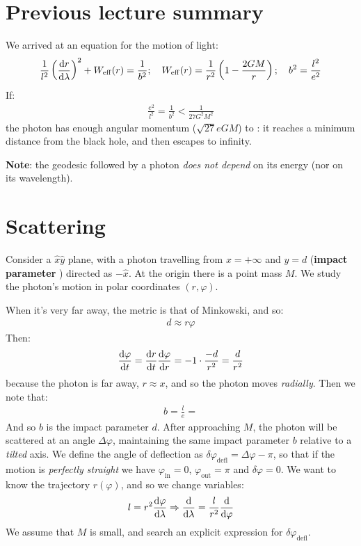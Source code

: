 \documentclass[../template.tex]{subfiles}
\begin{document}
\section{Previous lecture summary}
We arrived at an equation for the motion of light:
\begin{align*}
    \frac{1}{l^2}\left(\dv{r}{\lambda}\right)^2 + W_{\mathrm{eff} }(r) = \frac{1}{b^2}; \quad W_{\mathrm{eff} }(r) = \frac{1}{r^2} \left(1-\frac{2GM}{r} \right); \quad b^2 = \frac{l^2}{e^2}    
\end{align*}
If:
\begin{align*}
    \frac{e^2}{l^2} = \frac{1}{b^2} < \frac{1}{27 G^2M^2}   
\end{align*} 
the photon has enough angular momentum ($\sqrt{27} e GM$) to : it reaches a minimum distance from the black hole, and then escapes to infinity.

\begin{expl}
    \textbf{Note}: the geodesic followed by a photon \textit{does not depend} on its energy (nor on its wavelength).  
\end{expl}

\section{Scattering}
Consider a $\hat{x}\hat{y}$ plane, with a photon travelling from $x=+\infty$ and $y=d$ (\textbf{impact parameter} ) directed as $-\hat{x}$. At the origin there is a point mass $M$. We study the photon's motion in polar coordinates $(r, \varphi)$. 

When it's very far away, the metric is that of Minkowski, and so:
\begin{align*}
    d \approx r \varphi
\end{align*} 
Then:
\begin{align*}
    \dv{\varphi}{t} = \dv{r}{t} \dv{\varphi}{r} = -1 \cdot \frac{-d}{r^2} = \frac{d}{r^2}  
\end{align*}
because the photon is far away, $r \approx x$, and so the photon moves \textit{radially}. Then we note that:
\begin{align*}
    b = \frac{l}{e} =   
\end{align*}
And so $b$ is the impact parameter $d$. After approaching $M$, the photon will be scattered at an angle $\Delta \varphi$, maintaining the same impact parameter $b$ relative to a \textit{tilted} axis. We define the angle of deflection as $\delta\varphi_{\mathrm{defl} } = \Delta \varphi - \pi$, so that if the motion is \textit{perfectly straight} we have $\varphi_{\mathrm{in} } = 0$, $\varphi_\mathrm{out} = \pi$ and $\delta\varphi = 0$. We want to know the trajectory $r(\varphi)$, and so we change variables:
\begin{align*}
    l = r^2 \dv{\varphi}{\lambda} \Rightarrow \dv{\lambda} = \frac{l}{r^2} \dv{\varphi} 
\end{align*}        
We assume that $M$ is small, and search an explicit expression for $\delta\varphi_{\mathrm{defl} }$. 
\end{document}
